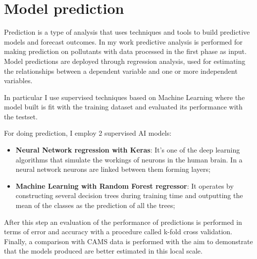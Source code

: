 \section{Model prediction}
Prediction is a type of analysis that uses techniques and tools to build predictive models and forecast outcomes. In my work predictive analysis is performed for making prediction on pollutants with data processed in the first phase as input.\newline
Model predictions are deployed through regression analysis, used for estimating the relationships between a dependent variable and one or more independent variables.\par
In particular I use supervised techniques based on Machine Learning where the model built is fit with the training dataset and evaluated its performance with the testset. 

For doing prediction, I employ 2 supervised AI models:
\begin{itemize}
\item \textbf{Neural Network regression with Keras}: It's one of the deep learning algorithms that simulate the workings of neurons in the human brain. In a neural network neurons are linked between them forming layers; 
\item \textbf{Machine Learning with Random Forest regressor}: It operates by constructing several decision trees during training time and outputting the mean of the classes as the prediction of all the trees;
\end{itemize}
After this step an evaluation of the performance of predictions is performed in terms of error and accuracy with a procedure called k-fold cross validation.\newline
Finally, a comparison with CAMS data is performed with the aim to demonstrate that the models produced are better estimated in this local scale.\par


